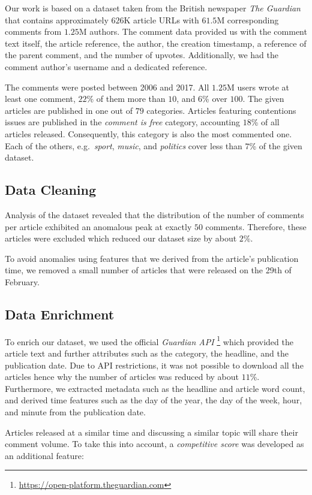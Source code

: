 Our work is based on a dataset taken from the British newspaper \textit{The Guardian} that contains approximately $626$K article URLs with $61.5$M corresponding comments from $1.25$M authors.
The comment data provided us with the comment text itself, the article reference, the author, the creation timestamp, a reference of the parent comment, and the number of upvotes. Additionally, we had the comment author's username and a dedicated reference.

The comments were posted between 2006 and 2017. All $1.25$M users wrote at least one comment, $22$\% of them more than $10$, and $6$\% over $100$.
The given articles are published in one out of $79$ categories. 
Articles featuring contentions issues are published in the \textit{comment is free} category, accounting $18$\% of all articles released.
Consequently, this category is also the most commented one. 
Each of the others, e.g.\ \textit{sport}, \textit{music}, and \textit{politics} cover less than $7$\% of the given dataset.

\subsection{Data Cleaning}
Analysis of the dataset revealed that the distribution of the number of comments per article exhibited an anomalous peak at exactly $50$ comments. 
Therefore, these articles were excluded which reduced our dataset size by about $2$\%.

To avoid anomalies using features that we derived from the article's publication time, we removed a small number of articles that were released on the 29th of February.

\subsection{Data Enrichment}
To enrich our dataset, we used the official \textit{Guardian API} \footnote{\url{https://open-platform.theguardian.com}} which provided the article text and further attributes such as the category, the headline, and the publication date.
Due to API restrictions, it was not possible to download all the articles hence why the number of articles was reduced by about $11$\%.
Furthermore, we extracted metadata such as the headline and article word count, and derived time features such as the day of the year, the day of the week, hour, and minute from the publication date.

Articles released at a similar time and discussing a similar topic will share their comment volume. To take this into account, a \textit{competitive score} was developed as an additional feature:

